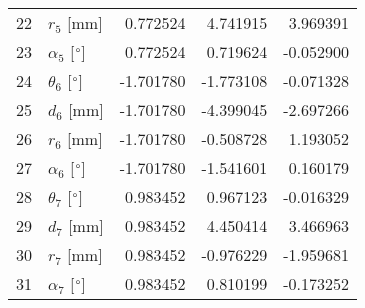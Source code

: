 \documentclass{standalone}%
\begin{document}
\begin{tabular}{llrrr}
22 &              $r_{5}$ [mm] &  0.772524 &   4.741915 &   3.969391 \\
23 &  $\alpha_{5}$ [$\degree$] &  0.772524 &   0.719624 &  -0.052900 \\
24 &  $\theta_{6}$ [$\degree$] & -1.701780 &  -1.773108 &  -0.071328 \\
25 &              $d_{6}$ [mm] & -1.701780 &  -4.399045 &  -2.697266 \\
26 &              $r_{6}$ [mm] & -1.701780 &  -0.508728 &   1.193052 \\
27 &  $\alpha_{6}$ [$\degree$] & -1.701780 &  -1.541601 &   0.160179 \\
28 &  $\theta_{7}$ [$\degree$] &  0.983452 &   0.967123 &  -0.016329 \\
29 &              $d_{7}$ [mm] &  0.983452 &   4.450414 &   3.466963 \\
30 &              $r_{7}$ [mm] &  0.983452 &  -0.976229 &  -1.959681 \\
31 &  $\alpha_{7}$ [$\degree$] &  0.983452 &   0.810199 &  -0.173252 \\
\bottomrule
\end{tabular}
%
\end{document}
